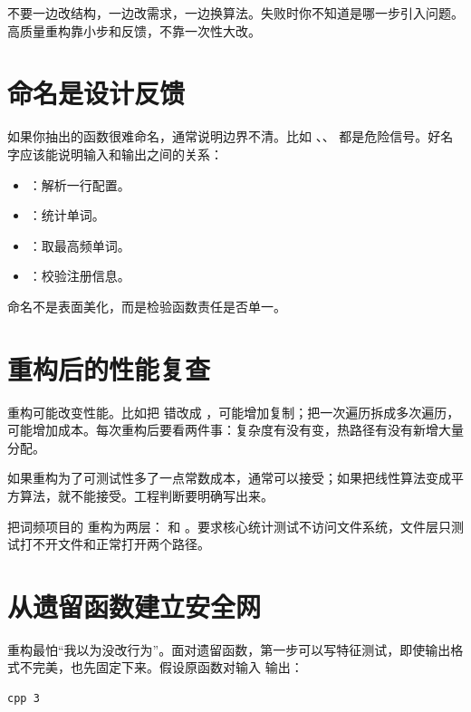不要一边改结构，一边改需求，一边换算法。失败时你不知道是哪一步引入问题。高质量重构靠小步和反馈，不靠一次性大改。

\section{命名是设计反馈}

如果你抽出的函数很难命名，通常说明边界不清。比如 、、 都是危险信号。好名字应该能说明输入和输出之间的关系：

\begin{itemize}
  \item {}：解析一行配置。
  \item {}：统计单词。
  \item {}：取最高频单词。
  \item {}：校验注册信息。
\end{itemize}

命名不是表面美化，而是检验函数责任是否单一。

\section{重构后的性能复查}

重构可能改变性能。比如把  错改成 ，可能增加复制；把一次遍历拆成多次遍历，可能增加成本。每次重构后要看两件事：复杂度有没有变，热路径有没有新增大量分配。

如果重构为了可测试性多了一点常数成本，通常可以接受；如果把线性算法变成平方算法，就不能接受。工程判断要明确写出来。

\begin{exercisebox}
把词频项目的  重构为两层： 和 。要求核心统计测试不访问文件系统，文件层只测试打不开文件和正常打开两个路径。
\end{exercisebox}

\section{从遗留函数建立安全网}

重构最怕“我以为没改行为”。面对遗留函数，第一步可以写特征测试，即使输出格式不完美，也先固定下来。假设原函数对输入  输出：

\begin{lstlisting}[caption={当前词频输出}]
cpp 3
\end{lstlisting}

